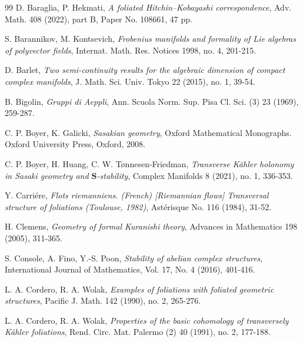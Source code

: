 \documentclass[12pt]{amsart}
\numberwithin{equation}{section}
\theoremstyle{definition}
\theoremstyle{definition}
\theoremstyle{definition}
\renewcommand{\1}{\mathsf{1}}
\renewcommand{\>}{\rightarrow}
\theoremstyle{plain} %
\theoremstyle{plain} %
\theoremstyle{plain} %
\begin{document}
\begin{thebibliography}{99}
		D. Baraglia, P. Hekmati,
		\textit{A foliated Hitchin--Kobayashi correspondence},
		Adv. Math. 408 (2022), part B, Paper No. 108661, 47 pp.
		
		
		 S. Barannikov, M. Kontsevich,
		\newblock \textit{Frobenius manifolds and formality of Lie algebras of
			polyvector fields},
		\newblock Internat. Math. Res. Notices 1998, no. 4, 201-215.
		
 D. Barlet, \textit{Two semi-continuity results for the algebraic dimension of compact complex manifolds}, J. Math. Sci. Univ. Tokyo 22 (2015), no. 1, 39-54.	
        
         B. Bigolin,
		\newblock \textit{Gruppi di Aeppli},
		\newblock
		Ann. Scuola Norm. Sup. Pisa Cl. Sci. (3) 23 (1969), 259-287.
		
			C. P. Boyer, K. Galicki,
		\textit{Sasakian geometry},  Oxford Mathematical Monographs. Oxford University Press, Oxford, 2008.
		
		C. P. Boyer, H. Huang, C. W.  T{\o}nnesen-Friedman,   \textit{Transverse K\"ahler holonomy in Sasaki geometry and $\boldsymbol{S}$-stability}, Complex Manifolds 8 (2021), no. 1, 336-353.
		
		
		
		Y. Carri\'ere,
		\textit{Flots riemanniens. (French) [Riemannian flows] Transversal structure of foliations (Toulouse, 1982)},
		Ast\'erisque No. 116 (1984), 31-52.
		
		 H. Clemens,
		\newblock \textit{Geometry of formal Kuranishi theory},
		\newblock Advances in Mathematics {198} (2005), 311-365.
		
		 S. Console, A. Fino, Y.-S. Poon,
		\newblock \textit{Stability of abelian complex structures},
		\newblock International Journal of Mathematics, Vol. 17, No. 4 (2016), 401-416.
		
		L. A. Cordero,  R. A. Wolak,
		\textit{Examples of foliations with foliated geometric structures},
		Pacific J. Math. 142 (1990), no. 2, 265-276.
		
		L. A. Cordero,  R. A. Wolak,
		\textit{Properties of the basic cohomology of transversely K\"ahler foliations}, Rend. Circ. Mat. Palermo (2) 40 (1991), no. 2, 177-188.
		
		
		
		
		

\end{thebibliography}
\end{document}
